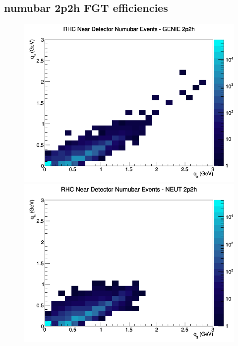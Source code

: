 \documentclass[12pt]{article}
\begin{document}
\subsection{numubar 2p2h FGT efficiencies}
\begin{figure}[h]
\includegraphics[width=\linewidth]{eff_q0_q3/FGT/2p2h_RHC_ND_numubar_q3_q0_GENIE.png}
\endminipage
{}
\includegraphics[width=\linewidth]{eff_q0_q3/FGT/2p2h_RHC_ND_numubar_q3_q0_NEUT.png}
\endminipage
{}

\end{figure}
\end{document}
